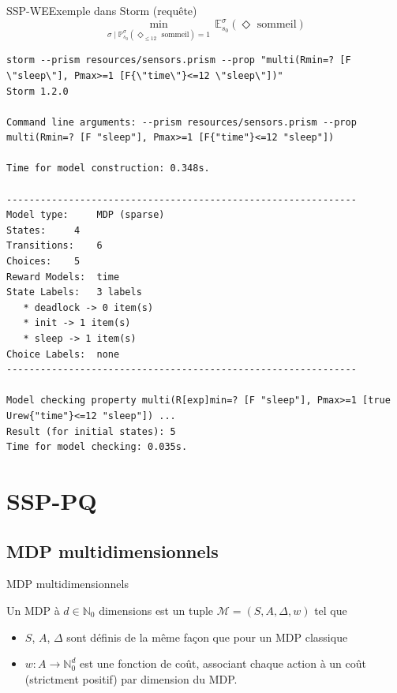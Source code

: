 \documentclass[compress]{beamer}
\theoremstyle{theorem}%
\begin{document}
\begin{frame}[fragile]{SSP-WE}{Exemple dans Storm (requête)}
    \vspace{-0.05\linewidth}
    \[ \min_{\sigma \; | \;  \mathbb{P}^\sigma_{s_0}(\Diamond_{\leq 12} \text{ sommeil}) = 1} \, \mathbb{E}^{\sigma}_{s_0}(\Diamond \text{ sommeil}) \]
  {\fontsize{4}{5}
  \begin{verbatim}
storm --prism resources/sensors.prism --prop "multi(Rmin=? [F \"sleep\"], Pmax>=1 [F{\"time\"}<=12 \"sleep\"])"
Storm 1.2.0

Command line arguments: --prism resources/sensors.prism --prop multi(Rmin=? [F "sleep"], Pmax>=1 [F{"time"}<=12 "sleep"])

Time for model construction: 0.348s.

--------------------------------------------------------------
Model type: 	MDP (sparse)
States: 	4
Transitions: 	6
Choices: 	5
Reward Models:  time
State Labels: 	3 labels
   * deadlock -> 0 item(s)
   * init -> 1 item(s)
   * sleep -> 1 item(s)
Choice Labels: 	none
--------------------------------------------------------------

Model checking property multi(R[exp]min=? [F "sleep"], Pmax>=1 [true Urew{"time"}<=12 "sleep"]) ...
Result (for initial states): 5
Time for model checking: 0.035s.
  \end{verbatim}
  }
\end{frame}

\section{SSP-PQ}
\subsection{MDP multidimensionnels}
\begin{frame}{MDP multidimensionnels}
  \begin{definition}
    Un MDP à $d \in \mathbb{N}_0$ dimensions est un tuple $\mathcal{M} = (S, A, \Delta, w)$ tel que
    \begin{itemize}
      \item $S$, $A$, $\Delta$ sont définis de la même façon que pour un MDP classique
      \item $w : A \rightarrow \mathbb{N}_0^d$ est une fonction de coût, associant chaque action à un coût (strictment positif) par dimension du MDP.
    \end{itemize}
  \end{definition}
\end{frame}
\end{document}
